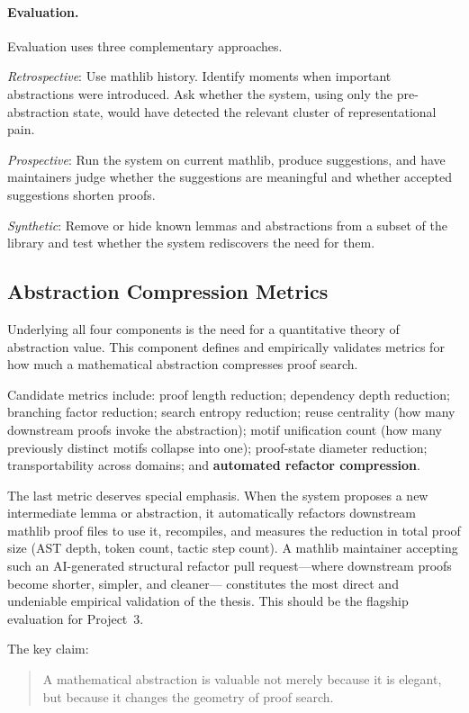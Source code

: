 \documentclass[12pt, a4paper]{article}
\begin{document}
\paragraph{Evaluation.}
Evaluation uses three complementary approaches.

\textit{Retrospective}: Use mathlib history. Identify moments when important
abstractions were introduced. Ask whether the system, using only the
pre-abstraction state, would have detected the relevant cluster of
representational pain.

\textit{Prospective}: Run the system on current mathlib, produce suggestions,
and have maintainers judge whether the suggestions are meaningful and whether
accepted suggestions shorten proofs.

\textit{Synthetic}: Remove or hide known lemmas and abstractions from a
subset of the library and test whether the system rediscovers the need for
them.

\subsection{Abstraction Compression Metrics}

Underlying all four components is the need for a quantitative theory of
abstraction value. This component defines and empirically validates metrics
for how much a mathematical abstraction compresses proof search.

Candidate metrics include: proof length reduction; dependency depth reduction;
branching factor reduction; search entropy reduction; reuse centrality (how
many downstream proofs invoke the abstraction); motif unification count (how
many previously distinct motifs collapse into one); proof-state diameter
reduction; transportability across domains; and \textbf{automated refactor
compression}.

The last metric deserves special emphasis. When the system proposes a new
intermediate lemma or abstraction, it automatically refactors downstream
mathlib proof files to use it, recompiles, and measures the reduction in
total proof size (AST depth, token count, tactic step count). A mathlib
maintainer accepting such an AI-generated structural refactor pull
request---where downstream proofs become shorter, simpler, and cleaner---
constitutes the most direct and undeniable empirical validation of the
thesis. This should be the flagship evaluation for Project~3.

The key claim:
\begin{quote}
A mathematical abstraction is valuable not merely because it is elegant, but
because it changes the geometry of proof search.
\end{quote}
\end{document}

